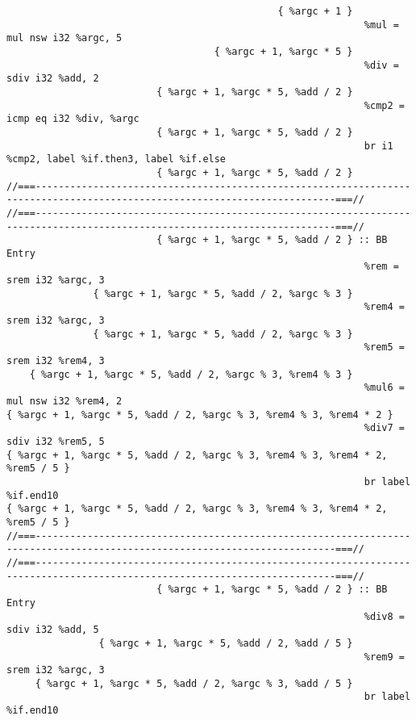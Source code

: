 \begin{verbatim}
                                               { %argc + 1 }
                                                              %mul = mul nsw i32 %argc, 5
                                    { %argc + 1, %argc * 5 }
                                                              %div = sdiv i32 %add, 2
                          { %argc + 1, %argc * 5, %add / 2 }
                                                              %cmp2 = icmp eq i32 %div, %argc
                          { %argc + 1, %argc * 5, %add / 2 }
                                                              br i1 %cmp2, label %if.then3, label %if.else
                          { %argc + 1, %argc * 5, %add / 2 }
//===--------------------------------------------------------------------------------------------------------------------------===//
//===--------------------------------------------------------------------------------------------------------------------------===//
                          { %argc + 1, %argc * 5, %add / 2 } :: BB Entry
                                                              %rem = srem i32 %argc, 3
               { %argc + 1, %argc * 5, %add / 2, %argc % 3 }
                                                              %rem4 = srem i32 %argc, 3
               { %argc + 1, %argc * 5, %add / 2, %argc % 3 }
                                                              %rem5 = srem i32 %rem4, 3
    { %argc + 1, %argc * 5, %add / 2, %argc % 3, %rem4 % 3 }
                                                              %mul6 = mul nsw i32 %rem4, 2
{ %argc + 1, %argc * 5, %add / 2, %argc % 3, %rem4 % 3, %rem4 * 2 }
                                                              %div7 = sdiv i32 %rem5, 5
{ %argc + 1, %argc * 5, %add / 2, %argc % 3, %rem4 % 3, %rem4 * 2, %rem5 / 5 }
                                                              br label %if.end10
{ %argc + 1, %argc * 5, %add / 2, %argc % 3, %rem4 % 3, %rem4 * 2, %rem5 / 5 }
//===--------------------------------------------------------------------------------------------------------------------------===//
//===--------------------------------------------------------------------------------------------------------------------------===//
                          { %argc + 1, %argc * 5, %add / 2 } :: BB Entry
                                                              %div8 = sdiv i32 %add, 5
                { %argc + 1, %argc * 5, %add / 2, %add / 5 }
                                                              %rem9 = srem i32 %argc, 3
     { %argc + 1, %argc * 5, %add / 2, %argc % 3, %add / 5 }
                                                              br label %if.end10

\end{verbatim}
